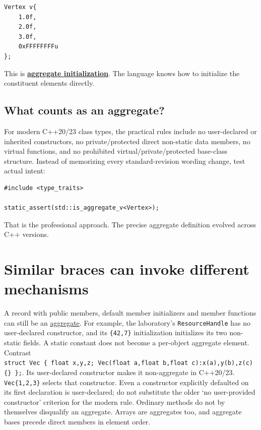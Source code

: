 \begin{verbatim}
Vertex v{
    1.0f,
    2.0f,
    3.0f,
    0xFFFFFFFFu
};
\end{verbatim}

This is \textbf{\hyperref[appendix-b7174c179542]{aggregate initialization}}. The language knows how to initialize the constituent elements directly.

\subsection{What counts as an aggregate?}\label{05-engine-i-ch003-what-counts-as-an-aggregate}

For modern C++20/23 class types, the practical rules include no user-declared or inherited constructors, no private/protected direct non-static data members, no virtual functions, and no prohibited virtual/private/protected base-class structure. Instead of memorizing every standard-revision wording change, test actual intent:

\begin{verbatim}
#include <type_traits>

static_assert(std::is_aggregate_v<Vertex>);
\end{verbatim}

That is the professional approach. The precise aggregate definition evolved across C++ versions.

\section{Similar braces can invoke different mechanisms}\label{05-engine-i-ch003-similar-braces-can-invoke-different-mechanisms}

A record with public members, default member initializers and member functions can still be an \hyperref[appendix-b7174c179542]{aggregate}. For example, the laboratory's \texttt{ResourceHandle} has no user-declared constructor, and its \texttt{\{42,7\}} initialization initializes its two non-static fields. A static constant does not become a per-object aggregate element. Contrast \texttt{struct\ Vec\ \{\ float\ x,y,z;\ Vec(float\ a,float\ b,float\ c):x(a),y(b),z(c)\{\}\ \};}. Its user-declared constructor makes it non-aggregate in C++20/23. \texttt{Vec\{1,2,3\}} selects that constructor. Even a constructor explicitly defaulted on its first declaration is user-declared; do not substitute the older `no user-provided constructor' criterion for the modern rule. Ordinary methods do not by themselves disqualify an aggregate. Arrays are aggregates too, and aggregate bases precede direct members in element order.

